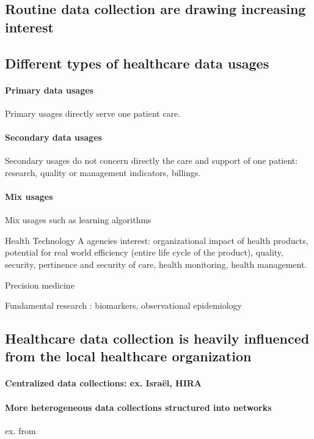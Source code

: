 \documentclass{report}
\begin{document}
\subsection{Routine data collection are drawing increasing interest}\label{chapter:cdw:routine_data_collection}

\subsection{Different types of healthcare data usages}\label{subsec:cdw:data_usages}

\paragraph{Primary data usages}
Primary usages directly serve one patient care.

\paragraph{Secondary data usages}
Secondary usages do not concern directly the care and support of one patient: research, quality or management indicators, billings.

\paragraph{Mix usages}

Mix usages such as learning algorithms

Health Technology A agencies interest: organizational impact of health products, potential for real world efficiency (entire life cycle of the product), quality, security, pertinence and security of care, health monitoring, health management.

Precision medicine

Fundamental research : biomarkers, observational epidemiology

\subsection{Healthcare data collection is heavily influenced from the local healthcare organization}

\paragraph{Centralized data collections: ex. Israël, HIRA}

\paragraph{More heterogeneous data collections structured into networks} ex. from
\end{document}
